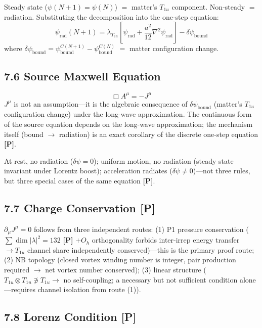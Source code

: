 \documentclass[11pt,a4paper]{article}
\newcommand{\gradeP}{\textbf{[P]}}
\begin{document}
Steady state ($\psi(N{+}1)=\psi(N)$) $=$ matter's $T_{1u}$ component. Non-steady $=$ radiation. Substituting the decomposition into the one-step equation:
\[
\psi_{\mathrm{rad}}(N{+}1) = \lambda_{T_{1u}}\!\left[\psi_{\mathrm{rad}} + \frac{a^2}{12}\nabla^2\psi_{\mathrm{rad}}\right] - \delta\psi_{\mathrm{bound}}
\]
where $\delta\psi_{\mathrm{bound}} = \psi_{\mathrm{bound}}^{C(N+1)} - \psi_{\mathrm{bound}}^{C(N)}$ $=$ matter configuration change.

\subsection{7.6 Source Maxwell Equation}

\begin{equation}
\boxed{\Box A^\mu = -J^\mu}
\end{equation}
$J^\mu$ is not an assumption---it is the algebraic consequence of $\delta\psi_{\mathrm{bound}}$ (matter's $T_{1u}$ configuration change) under the long-wave approximation. The continuous form of the source equation depends on the long-wave approximation; the mechanism itself (bound $\to$ radiation) is an exact corollary of the discrete one-step equation \gradeP.

At rest, no radiation ($\delta\psi=0$); uniform motion, no radiation (steady state invariant under Lorentz boost); acceleration radiates ($\delta\psi\neq 0$)---not three rules, but three special cases of the same equation \gradeP.

\subsection{7.7 Charge Conservation \gradeP}

$\partial_\mu J^\mu = 0$ follows from three independent routes: (1) P1 pressure conservation ($\sum\dim|\lambda|^2=132$ \gradeP{} $+ O_h$ orthogonality forbids inter-irrep energy transfer $\to T_{1u}$ channel share independently conserved)---this is the primary proof route; (2) NB topology (closed vortex winding number is integer, pair production required $\to$ net vortex number conserved); (3) linear structure ($T_{1u}\otimes T_{1u}\not\ni T_{1u}\to$ no self-coupling; a necessary but not sufficient condition alone---requires channel isolation from route (1)).

\subsection{7.8 Lorenz Condition \gradeP}
\end{document}
